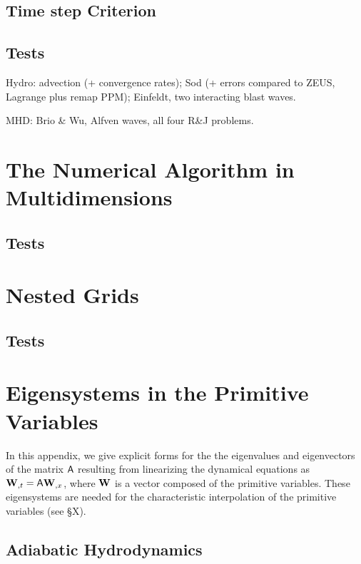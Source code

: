 \subsection{Time step Criterion}

\subsection{Tests}

Hydro: advection (+ convergence rates); Sod (+ errors compared to ZEUS, Lagrange plus remap PPM); Einfeldt, two interacting blast waves.

MHD: Brio \& Wu, Alfven waves, all four R\&J problems.

\section{The Numerical Algorithm in Multidimensions}

\subsection{Tests}

\section{Nested Grids}

\subsection{Tests}

\appendix
\setcounter{equation}{0}
\renewcommand{\theequation}{\Alph{section}\arabic{equation}}
\section{Eigensystems in the Primitive Variables}

In this appendix, we give explicit forms for the the eigenvalues and
eigenvectors of the matrix ${\sf A}$ resulting from linearizing the
dynamical equations as ${\bf W}_{,t} = {\sf A}{\bf W}_{,x}$, where
${\bf W}$ is a vector composed of the primitive variables.  These
eigensystems are needed for the characteristic interpolation of the
primitive variables (see \S X).

\subsection{Adiabatic Hydrodynamics}

